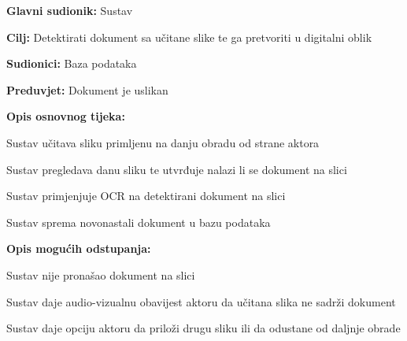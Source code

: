 					
					\noindent {}
					\begin{packed_item}
						
						\item \textbf{Glavni sudionik: } Sustav
						\item \textbf{Cilj:} Detektirati dokument sa učitane slike te ga pretvoriti u digitalni oblik
						\item \textbf{Sudionici:} Baza podataka
						\item \textbf{Preduvjet:} Dokument je uslikan
						\item \textbf{Opis osnovnog tijeka:}
						
						\item[] \begin{packed_enum}
							
							\item Sustav učitava sliku primljenu na danju obradu od strane aktora
							\item Sustav pregledava danu sliku te utvrđuje nalazi li se dokument na slici
							\item Sustav primjenjuje OCR na detektirani dokument na slici
							\item Sustav sprema novonastali dokument u bazu podataka
							
						\end{packed_enum}
						
						\item \textbf{Opis mogućih odstupanja:}
						
						\item[] \begin{packed_item}
							
							\item[2.a] Sustav nije pronašao dokument na slici
							\item[] \begin{packed_enum}
								
								\item Sustav daje audio-vizualnu obavijest aktoru da učitana slika ne sadrži dokument
								\item Sustav daje opciju aktoru da priloži drugu sliku ili da odustane od daljnje obrade
								
							\end{packed_enum}
							
						\end{packed_item}
						
					\end{packed_item}
					
